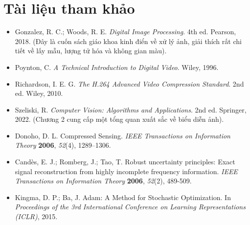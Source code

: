 \section*{Tài liệu tham khảo}
\begin{itemize}
    \item[1] Gonzalez, R. C.; Woods, R. E. \textit{Digital Image Processing}. 4th ed. Pearson, 2018. (Đây là cuốn sách giáo khoa kinh điển về xử lý ảnh, giải thích rất chi tiết về lấy mẫu, lượng tử hóa và không gian màu).
    \item[2] Poynton, C. \textit{A Technical Introduction to Digital Video}. Wiley, 1996.
    \item[3] Richardson, I. E. G. \textit{The H.264 Advanced Video Compression Standard}. 2nd ed. Wiley, 2010.
    \item[4] Szeliski, R. \textit{Computer Vision: Algorithms and Applications}. 2nd ed. Springer, 2022. (Chương 2 cung cấp một tổng quan xuất sắc về biểu diễn ảnh).
    \item[5] Donoho, D. L. Compressed Sensing. \textit{IEEE Transactions on Information Theory} \textbf{2006}, \textit{52}(4), 1289–1306.
    \item[6] Candès, E. J.; Romberg, J.; Tao, T. Robust uncertainty principles: Exact signal reconstruction from highly incomplete frequency information. \textit{IEEE Transactions on Information Theory} \textbf{2006}, \textit{52}(2), 489-509.
    \item[7] Kingma, D. P.; Ba, J. Adam: A Method for Stochastic Optimization. In \textit{Proceedings of the 3rd International Conference on Learning Representations (ICLR)}, 2015.
\end{itemize}